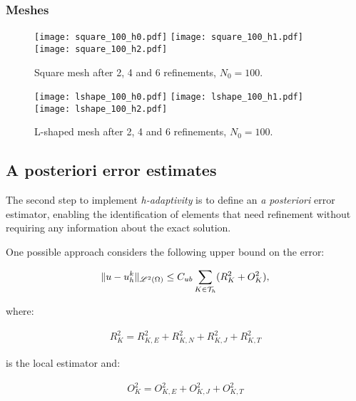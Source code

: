 \newpage
\subsubsection{Meshes}

\begin{figure}[!ht]
	\centering
	\texttt{[image: square\_100\_h0.pdf]}
    \texttt{[image: square\_100\_h1.pdf]}
    \texttt{[image: square\_100\_h2.pdf]}
	\caption{Square mesh after 2, 4 and 6 refinements, $N_0 = 100$.}
\end{figure}

\begin{figure}[!ht]
	\centering
	\texttt{[image: lshape\_100\_h0.pdf]}
    \texttt{[image: lshape\_100\_h1.pdf]}
    \texttt{[image: lshape\_100\_h2.pdf]}
	\caption{L-shaped mesh after 2, 4 and 6 refinements, $N_0 = 100$.}
\end{figure}

\newpage
\subsection{A posteriori error estimates}

The second step to implement \textit{h-adaptivity} is to define an \textit{a posteriori} error estimator, enabling the identification of elements that need refinement without requiring any information about the exact solution.

\cite{Cangiani2023} One possible approach considers the following upper bound on the error:

\begin{gather}
	\lVert u - u^k_h \rVert_{\mathscr{L}^2(\Omega)} \leq C_{ub} \sum_{K \in \mathcal{T}_h} (R_K^2 + O_K^2),
\end{gather}

where:

\begin{gather}
	R_K^2 = R_{K, E}^2 + R_{K, N}^2 + R_{K, J}^2 + R_{K, T}^2
\end{gather}

is the local estimator and:

\begin{gather}
	O_K^2 = O_{K, E}^2 + O_{K, J}^2 + O_{K, T}^2
\end{gather}

